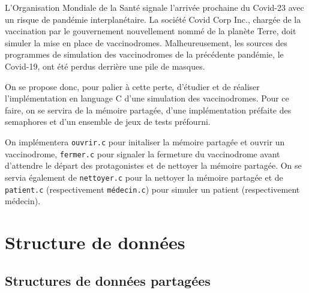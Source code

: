 \documentclass[a4paper]{article}
\begin{document}
L’Organisation Mondiale de la Santé signale l’arrivée prochaine du Covid-23 avec un risque de pandémie interplanétaire. La société Covid Corp Inc., chargée de la vaccination par le gouvernement nouvellement nommé de la planète Terre, doit simuler la mise en place de vaccinodromes. Malheureusement, les sources des programmes de simulation des vaccinodromes de la précédente pandémie, le Covid-19, ont été perdus derrière une pile de masques.
\smallskip \par On se propose donc, pour palier à cette perte, d'étudier et de réaliser l'implémentation en language C d'une simulation des vaccinodromes. Pour ce faire, on se servira de la mémoire partagée, d'une implémentation préfaite des semaphores et d'un ensemble de jeux de tests préfourni. 
\smallskip \par On implémentera \texttt{ouvrir.c} pour initaliser la mémoire partagée et ouvrir un vaccinodrome, \texttt{fermer.c} pour signaler la fermeture du vaccinodrome avant d'attendre le départ des protagonistes et de nettoyer la mémoire partagée. On se servia également de \texttt{nettoyer.c} pour la nettoyer la mémoire partagée et de \texttt{patient.c} (respectivement \texttt{médecin.c}) pour simuler un patient  (respectivement médecin).

\newpage 

\section{Structure de données}

\subsection{Structures de données partagées}\label{sec-shm}
\end{document}
